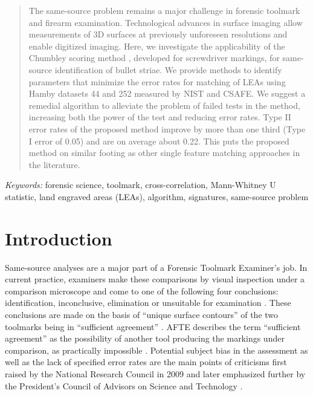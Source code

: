 \documentclass[12pt]{article}
\begin{document}
\bigskip
\begin{abstract}
The same-source problem remains a major challenge in forensic toolmark
and firearm examination. Technological advances in surface imaging allow
measurements of 3D surfaces at previously unforeseen resolutions and
enable digitized imaging. Here, we investigate the applicability of the
Chumbley scoring method \cite{hadler}, developed for screwdriver
markings, for same-source identification of bullet striae. We provide
methods to identify parameters that minimize the error rates for
matching of LEAs using Hamby datasets 44 and 252 measured by NIST and
CSAFE. We suggest a remedial algorithm to alleviate the problem of
failed tests in the method, increasing both the power of the test and
reducing error rates. Type II error rates of the proposed method improve
by more than one third (Type I error of 0.05) and are on average about
0.22. This puts the proposed method on similar footing as other single
feature matching approaches in the literature.
\end{abstract}

\noindent%
{\it Keywords:} forensic science, toolmark, cross-correlation, Mann-Whitney U statistic, land engraved areas (LEAs), algorithm, signatures, same-source problem
\vfill

\newpage
{} %

\newcommand{\hh}[1]{{\textcolor{orange}{#1}}}
\newcommand{\gk}[1]{{\textcolor{blue}{#1}}}
\newcommand{\cited}[1]{{\textcolor{red}{#1}}}
\setlength\parindent{0pt}

\tableofcontents
\newpage

\hypertarget{introduction}{%
\section{Introduction}\label{introduction}}

Same-source analyses are a major part of a Forensic Toolmark Examiner's
job. In current practice, examiners make these comparisons by visual
inspection under a comparison microscope and come to one of the
following four conclusions: identification, inconclusive, elimination or
unsuitable for examination \cite{afte-toolmarks1998}. These conclusions
are made on the basis of ``unique surface contours'' of the two
toolmarks being in ``sufficient agreement'' \cite{afte-toolmarks1998}.
AFTE describes the term ``sufficient agreement'' as the possibility of
another tool producing the markings under comparison, as practically
impossible \cite{afte-toolmarks1998}. Potential subject bias in the
assessment as well as the lack of specified error rates are the main
points of criticisms first raised by the National Research Council in
2009 \cite{NAS:2009} and later emphasized further by the President's
Council of Advisors on Science and Technology \cite{pcast2016}.
\end{document}
